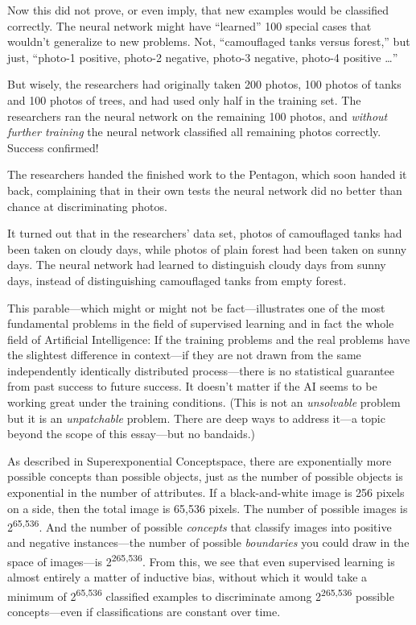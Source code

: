 {
 Now this did not prove, or even imply, that new examples would be
classified correctly. The neural network might have
``learned'' 100 special cases that
wouldn't generalize to new problems. Not,
``camouflaged tanks versus forest,''
but just, ``photo-1 positive, photo-2 negative,
photo-3 negative, photo-4 positive \ldots''}

{
 But wisely, the researchers had originally taken 200 photos, 100
photos of tanks and 100 photos of trees, and had used only half in the
training set. The researchers ran the neural network on the remaining
100 photos, and \textit{without further training} the neural network
classified all remaining photos correctly. Success confirmed!}

{
 The researchers handed the finished work to the Pentagon, which
soon handed it back, complaining that in their own tests the neural
network did no better than chance at discriminating photos.}

{
 It turned out that in the researchers' data set,
photos of camouflaged tanks had been taken on cloudy days, while photos
of plain forest had been taken on sunny days. The neural network had
learned to distinguish cloudy days from sunny days, instead of
distinguishing camouflaged tanks from empty forest.}

{
 This parable---which might or might not be fact---illustrates one
of the most fundamental problems in the field of supervised learning
and in fact the whole field of Artificial Intelligence: If the training
problems and the real problems have the slightest difference in
context---if they are not drawn from the same independently identically
distributed process---there is no statistical guarantee from past
success to future success. It doesn't matter if the AI
seems to be working great under the training conditions. (This is not
an \textit{unsolvable} problem but it is an \textit{unpatchable}
problem. There are deep ways to address it---a topic beyond the scope
of this essay---but no bandaids.)}

{
 As described in Superexponential Conceptspace, there are
exponentially more possible concepts than possible objects, just as the
number of possible objects is exponential in the number of attributes.
If a black-and-white image is 256 pixels on a side, then the total
image is 65,536 pixels. The number of possible images is
2\textsuperscript{65,536}. And the number of possible \textit{concepts}
that classify images into positive and negative instances---the number
of possible \textit{boundaries} you could draw in the space of
images---is 2\textsuperscript{265,536}. From this, we see that even
supervised learning is almost entirely a matter of inductive bias,
without which it would take a minimum of 2\textsuperscript{65,536}
classified examples to discriminate among 2\textsuperscript{265,536}
possible concepts---even if classifications are constant over time.}

